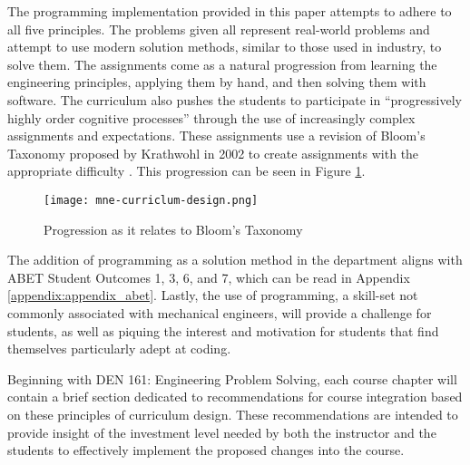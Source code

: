 The programming implementation provided in this paper attempts to adhere to all five
principles. The problems given all represent real-world problems and attempt to use
modern solution methods, similar to those used in industry, to solve them. The assignments
come as a natural progression from learning the engineering principles, applying them by
hand, and then solving them with software. The curriculum also pushes the students to 
participate in ``progressively highly order cognitive processes'' through the use of 
increasingly complex assignments and expectations. These assignments use a revision of
Bloom's Taxonomy proposed by Krathwohl in 2002 to create assignments with the appropriate
difficulty \cite{revised-bloom}. This progression can be seen in Figure \ref{revised-bloom-taxonomy}.

\begin{figure}
    \texttt{[image: mne-curriclum-design.png]}
    \caption{Progression as it relates to Bloom's Taxonomy}
    \label{revised-bloom-taxonomy}
\end{figure}

The addition of programming as a solution method in the department aligns with ABET 
Student Outcomes 1, 3, 6, and 7, which can be read in Appendix \ref{appendix:appendix_abet}.
Lastly, the use of programming, a skill-set not commonly associated with mechanical
engineers, will provide a challenge for students, as well as piquing the interest and 
motivation for students that find themselves particularly adept at coding.

Beginning with DEN 161: Engineering Problem Solving, each course chapter will contain
a brief section dedicated to recommendations for course integration based on these
principles of curriculum design. These recommendations are intended to provide insight
of the investment level needed by both the instructor and the students to effectively 
implement the proposed changes into the course.